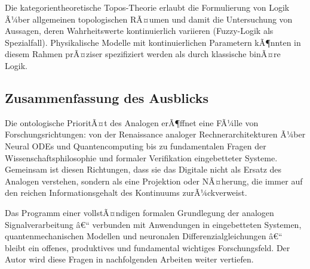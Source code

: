 ﻿\documentclass[a4paper,12pt]{article}
\theoremstyle{definition}
\begin{document}
Die kategorientheoretische Topos-Theorie \citep{Lawvere1968} erlaubt die
Formulierung von Logik Ã¼ber allgemeinen topologischen RÃ¤umen und damit die
Untersuchung von Aussagen, deren Wahrheitswerte kontinuierlich variieren
(Fuzzy-Logik als Spezialfall).  Physikalische Modelle mit kontinuierlichen
Parametern kÃ¶nnten in diesem Rahmen prÃ¤ziser spezifiziert werden als
durch klassische binÃ¤re Logik.

\subsection{Zusammenfassung des Ausblicks}

Die ontologische PrioritÃ¤t des Analogen erÃ¶ffnet eine FÃ¼lle von Forschungsrichtungen:
von der Renaissance analoger Rechnerarchitekturen Ã¼ber Neural ODEs und
Quantencomputing bis zu fundamentalen Fragen der Wissenschaftsphilosophie
und formaler Verifikation eingebetteter Systeme.  Gemeinsam ist diesen Richtungen,
dass sie das Digitale nicht als Ersatz des Analogen verstehen, sondern als
eine Projektion oder NÃ¤herung, die immer auf den reichen Informationsgehalt
des Kontinuums zurÃ¼ckverweist.

Das Programm einer vollstÃ¤ndigen formalen Grundlegung der analogen
Signalverarbeitung â€“ verbunden mit Anwendungen in eingebetteten Systemen,
quantenmechanischen Modellen und neuronalen Differenzialgleichungen â€“
bleibt ein offenes, produktives und fundamental wichtiges Forschungsfeld.
Der Autor wird diese Fragen in nachfolgenden Arbeiten \citep{Epp2026analog}
weiter vertiefen.



\end{document}
